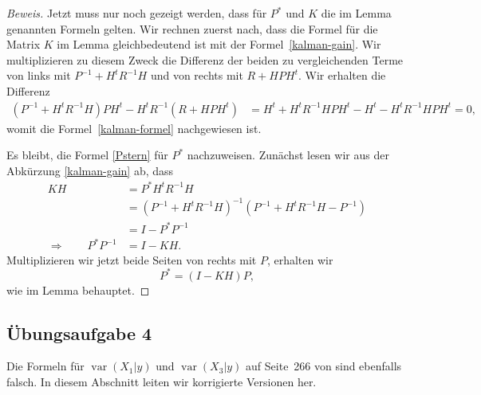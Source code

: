 \begin{proof}[Beweis]
Jetzt muss nur noch gezeigt werden, dass für $P^*$ und $K$ die im Lemma
genannten Formeln gelten.
Wir rechnen zuerst nach, dass die Formel für die Matrix $K$ im Lemma gleichbedeutend
ist mit der Formel~\eqref{kalman-gain}.
Wir multiplizieren zu diesem Zweck die Differenz der beiden zu vergleichenden
Terme von links mit
$P^{-1}+H^tR^{-1}H$
und von rechts mit $R+HPH^t$.
Wir erhalten die Differenz
\begin{align*}
(P^{-1}+H^tR^{-1}H)PH^t
-
H^tR^{-1}(R+HPH^t)
&=
H^t + H^tR^{-1}HPH^t
- H^t - H^tR^{-1}HPH^t
=0,
\end{align*}
womit die Formel~\eqref{kalman-formel} nachgewiesen ist.

Es bleibt, die Formel \eqref{Pstern} für $P^*$ nachzuweisen.
Zunächst lesen wir aus der Abkürzung \eqref{kalman-gain} ab, dass
\begin{align*}
KH
&=
P^*
H^tR^{-1}H
\\
&=
(P^{-1}+H^tR^{-1}H)^{-1}(P^{-1}
+H^tR^{-1}H
-P^{-1}
)
\\
&=
I- P^* P^{-1}
\\
\Rightarrow\qquad
P^*P^{-1}&=I-KH.
\end{align*}
Multiplizieren wir jetzt beide Seiten von rechts mit $P$, erhalten wir
\[
P^*
=
(I-KH)P,
\]
wie im Lemma behauptet.
\end{proof}

\subsection{Übungsaufgabe 4\label{subsection:aufgabe4}}
Die Formeln für
$\operatorname{var}(X_1|y)$
und
$\operatorname{var}(X_3|y)$
auf Seite~266 von \cite{skript:kaperengler} sind ebenfalls falsch.
In diesem Abschnitt leiten wir korrigierte Versionen her.

